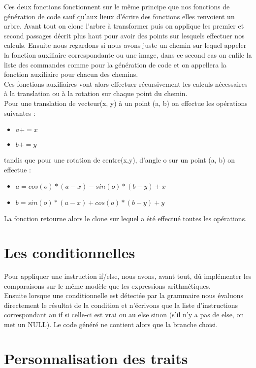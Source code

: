 \documentclass[a4paper,titlepage]{article}
\begin{document}
Ces deux fonctions fonctionnent sur le même principe que nos fonctions de génération de code sauf qu'aux lieux d'écrire des fonctions elles renvoient un arbre. Avant tout on clone l'arbre à transformer puis on applique les premier et second passages décrit plus haut pour avoir des points sur lesquels effectuer nos calculs. Ensuite nous regardons si nous avons juste un chemin sur lequel appeler la fonction auxiliaire correspondante ou une image, dans ce second cas on enfile la liste des commandes comme pour la génération de code et on appellera la fonction auxiliaire pour chacun des chemins.\\
Ces fonctions auxiliaires vont alors effectuer récursivement les calculs nécessaires à la translation ou à la rotation sur chaque point du chemin.\\

Pour une translation de vecteur(x, y) à un point (a, b) on effectue les opérations suivantes :
\begin{itemize}
\item $a += x$
\item $b += y$
\end{itemize}
tandis que pour une rotation de centre(x,y), d'angle o sur un point (a, b) on effectue :
\begin{itemize}
\item $a = cos(o)*(a-x) - sin(o)*(b-y) + x$
\item $b = sin(o)*(a-x) + cos(o)*(b-y) + y$
\end{itemize}

La fonction retourne alors le clone sur lequel a été effectué toutes les opérations.

\newpage
\section{Les conditionnelles}

Pour appliquer une instruction if/else, nous avons, avant tout, dû implémenter les comparaisons sur le même modèle que les expressions arithmétiques.\\
Ensuite lorsque une conditionnelle est détectée par la grammaire nous évaluons directement le résultat de la condition et n'écrivons que la liste d'instructions correspondant au if si celle-ci est vrai ou au else sinon (s'il n'y a pas de else, on met un NULL).
Le code généré ne contient alors que la branche choisi.

\vspace{2cm}
\section{Personnalisation des traits}
\end{document}
